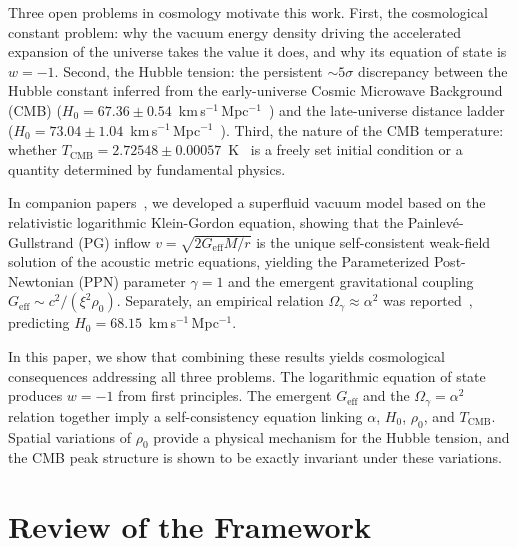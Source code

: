 \documentclass[12pt, a4paper]{article}
\newcommand{\Geff}{G_{\mathrm{eff}}}
\newcommand{\Tcmb}{T_{\mathrm{CMB}}}
\begin{document}
Three open problems in cosmology motivate this work. First, the cosmological constant problem: why the vacuum energy density driving the accelerated expansion of the universe takes the value it does, and why its equation of state is $w = -1$. Second, the Hubble tension: the persistent $\sim 5\sigma$ discrepancy between the Hubble constant inferred from the early-universe Cosmic Microwave Background (CMB) ($H_0 = 67.36 \pm 0.54$~km\,s$^{-1}$\,Mpc$^{-1}$~\cite{planck_2020}) and the late-universe distance ladder ($H_0 = 73.04 \pm 1.04$~km\,s$^{-1}$\,Mpc$^{-1}$~\cite{riess_2022}). Third, the nature of the CMB temperature: whether $\Tcmb = 2.72548 \pm 0.00057$~K~\cite{fixsen_2009} is a freely set initial condition or a quantity determined by fundamental physics.

In companion papers~\cite{kulangiev_2026a,kulangiev_2026b}, we developed a superfluid vacuum model based on the relativistic logarithmic Klein-Gordon equation, showing that the Painlev\'{e}-Gullstrand (PG) inflow $v = \sqrt{2\Geff M/r}$ is the unique self-consistent weak-field solution of the acoustic metric equations, yielding the Parameterized Post-Newtonian (PPN) parameter $\gamma = 1$ and the emergent gravitational coupling $\Geff \sim c^2/(\xi^2\rho_0)$. Separately, an empirical relation $\Omega_\gamma \approx \alpha^2$ was reported~\cite{kulangiev_2026o}, predicting $H_0 = 68.15$~km\,s$^{-1}$\,Mpc$^{-1}$.

In this paper, we show that combining these results yields cosmological consequences addressing all three problems. The logarithmic equation of state produces $w = -1$ from first principles. The emergent $\Geff$ and the $\Omega_\gamma = \alpha^2$ relation together imply a self-consistency equation linking $\alpha$, $H_0$, $\rho_0$, and $\Tcmb$. Spatial variations of $\rho_0$ provide a physical mechanism for the Hubble tension, and the CMB peak structure is shown to be exactly invariant under these variations.


\section{Review of the Framework}
\label{sec:review}
\end{document}
